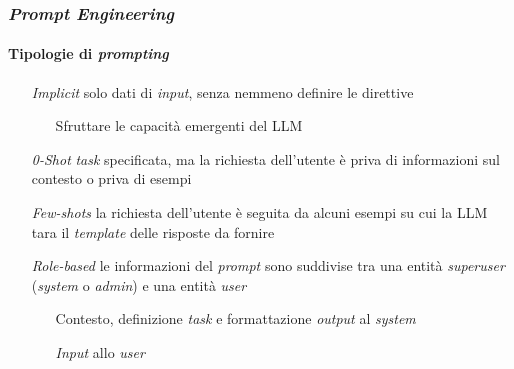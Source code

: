 \begin{frame}[t] \frametitle{\emph{Prompt Engineering}}
\framesubtitle{Tipologie di \emph{prompting}}
{\footnotesize
    \begin{minipage}[t]{\textwidth}
        \begin{itemize}[leftmargin=50pt,align=right]
            \item[\alert{\emph{Implicit}}] solo dati di \emph{input}, senza nemmeno definire le direttive
            \begin{itemize}[leftmargin=15pt,align=right]
                \item[\alert{\faArrowCircleRight}] Sfruttare le capacità emergenti del LLM
            \end{itemize}
            \item[\alert{\emph{0-Shot}}] \emph{task} specificata, ma la richiesta dell'utente è priva di informazioni sul contesto o priva di esempi
            \item[\alert{\emph{Few-shots}}] la richiesta dell'utente è seguita da alcuni esempi su cui la LLM tara il \emph{template} delle risposte da fornire
            \item[\alert{\emph{Role-based}}] le informazioni del \emph{prompt} sono suddivise tra una entità \emph{superuser} (\emph{system} o \emph{admin}) e una entità \emph{user}
            \begin{itemize}[leftmargin=15pt,align=right]
                \item[\alert{\faArrowCircleRight}] Contesto, definizione \emph{task} e formattazione \emph{output} al \emph{system}
                \item[\alert{\faArrowCircleRight}] \emph{Input} allo \emph{user}
            \end{itemize}
        \end{itemize}
    \end{minipage}
}
\end{frame}
%